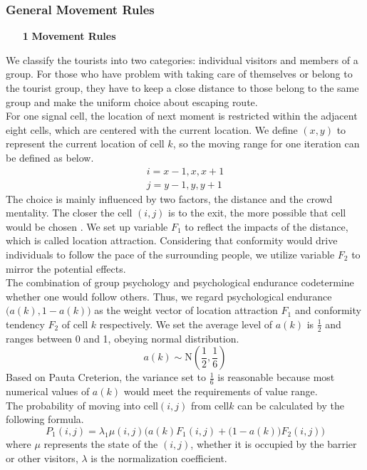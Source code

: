 \documentclass{mcmthesis}
\begin{document}
\subsubsection{General Movement Rules}
\begin{itemize}
	\item[\textbf {1}] \textbf {Movement Rules}
\end{itemize}
\noindent We classify the tourists into two categories: individual visitors and members of a group. For those who have problem with taking care of themselves or belong to the tourist group, they have to keep a close distance to those belong to the same group and make the uniform choice about escaping route.\\
\indent For one signal cell, the location of next moment is restricted within the adjacent eight cells, which are centered with the current location. We define \((x,y)\)  to represent the current location of cell \(k\), so the moving range for one iteration can be defined as below.
\begin{align}
	i=x-1,x,x+1\\
	j=y-1,y,y+1
\end{align}
\indent The choice is mainly influenced by two factors, the distance and the crowd mentality. The closer the cell \((i,j)\) is to the exit, the more possible that cell would be chosen . We set up variable \(F_1\) to reflect the impacts of the distance, which is called location attraction. Considering that conformity would drive individuals to follow the pace of the surrounding people, we utilize variable \(F_2\) to mirror the potential effects.\\
\indent The combination of group psychology and  psychological endurance codetermine whether one would follow others. Thus, we regard psychological endurance \(\big(a(k),1-a(k)\big)\) as the weight vector of location attraction \(F_1\) and conformity tendency \(F_2\) of cell \(k\) respectively. We set the average level of \(a(k)\) is \( \frac{1}{2} \) and ranges between 0 and 1, obeying normal distribution.
\[
	a(k)\sim\mathrm{N}(\frac{1}{2},\frac{1}{6})
\]
\indent Based on Pauta Creterion, the variance set to \( \frac{1}{6} \) is reasonable because most numerical values of  \(a(k)\) would  meet the requirements of value range.\\
\indent The probability of moving into cell\((i,j)\) from cell\(k\) can be calculated by the following formula.
\[
	P_1(i,j)=\lambda_1\mu(i,j)\Big(a(k)F_1(i,j)+\big(1-a(k)\big)F_2(i,j)\Big)
\]
\indent where \(\mu\) represents the state of the \((i,j)\), whether it is occupied by the barrier or other visitors, \(\lambda\) is the normalization coefficient.
\end{document}
